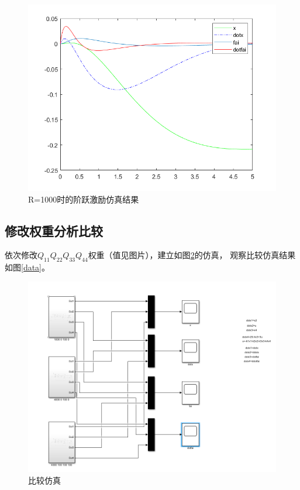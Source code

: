 \begin{figure}[hbpt]
\centering
\includegraphics[width=12cm]{1000_100_4.png}
\caption{R=1000时的阶跃激励仿真结果}\label{1000_100_4}
\end{figure}

\subsection{修改权重分析比较}

依次修改$Q_{11}Q_{22}Q_{33}Q_{44}$权重（值见图片），建立如图\ref{compare}的仿真，
观察比较仿真结果如图\ref{data}。

\begin{figure}[hbpt]
\centering
\includegraphics[width=12cm]{compare.png}
\caption{比较仿真}\label{compare}
\end{figure}

